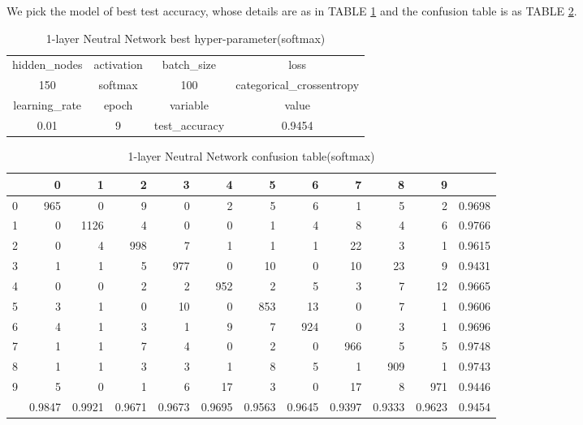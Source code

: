 \documentclass[conference]{IEEEtran}
\begin{document}
We pick the model of best test accuracy, whose details are as in TABLE \ref{1-layer Neutral Network best hyper-parameter(softmax)} and the confusion table is as TABLE \ref{1-layer Neutral Network confusion table(softmax)}.
\begin{table}[htbp]
\small
\centering
\caption{1-layer Neutral Network best hyper-parameter(softmax)}
\begin{tabular}{|c|c|c|c|}
  \hline
 hidden\_nodes & activation & batch\_size & loss \\

 150 & softmax & 100 & categorical\_crossentropy \\
  \hline
 learning\_rate & epoch & variable & value \\ 

 0.01 &   9 & test\_accuracy & 0.9454 \\ 
   \hline
\end{tabular}
\label{1-layer Neutral Network best hyper-parameter(softmax)}	
\end{table}



\begin{table}[htbp]
\tiny
  \centering
  \caption{1-layer Neutral Network confusion table(softmax)}
\begin{tabular}{|r|rrrrrrrrrr|r|}
\hline
  & 0 & 1 & 2 & 3 & 4 & 5 & 6 & 7 & 8 & 9 &  \\
\hline
0 & 965 & 0 & 9 & 0 & 2 & 5 & 6 & 1 & 5 & 2 & 0.9698 \\
1 & 0 & 1126 & 4 & 0 & 0 & 1 & 4 & 8 & 4 & 6 & 0.9766 \\
2 & 0 & 4 & 998 & 7 & 1 & 1 & 1 & 22 & 3 & 1 & 0.9615 \\
3 & 1 & 1 & 5 & 977 & 0 & 10 & 0 & 10 & 23 & 9 & 0.9431 \\
4 & 0 & 0 & 2 & 2 & 952 & 2 & 5 & 3 & 7 & 12 & 0.9665 \\
5 & 3 & 1 & 0 & 10 & 0 & 853 & 13 & 0 & 7 & 1 & 0.9606 \\
6 & 4 & 1 & 3 & 1 & 9 & 7 & 924 & 0 & 3 & 1 & 0.9696 \\
7 & 1 & 1 & 7 & 4 & 0 & 2 & 0 & 966 & 5 & 5 & 0.9748 \\
8 & 1 & 1 & 3 & 3 & 1 & 8 & 5 & 1 & 909 & 1 & 0.9743 \\
9 & 5 & 0 & 1 & 6 & 17 & 3 & 0 & 17 & 8 & 971 & 0.9446 \\
\hline
  & 0.9847 & 0.9921 & 0.9671 & 0.9673 & 0.9695 & 0.9563 & 0.9645 & 0.9397 & 0.9333 & 0.9623 & 0.9454 \\
\hline
\end{tabular}%

  \label{1-layer Neutral Network confusion table(softmax)}%
\end{table}%
\end{document}
